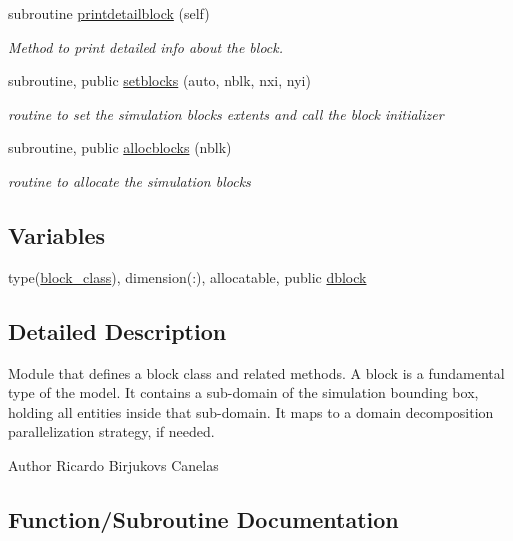 \begin{DoxyCompactItemize}
subroutine \mbox{\hyperlink{namespaceblocks__mod_a10f356706988c45a255922fe70851488}{printdetailblock}} (self)
\begin{DoxyCompactList}\small\item\em Method to print detailed info about the block. \end{DoxyCompactList}\item 
subroutine, public \mbox{\hyperlink{namespaceblocks__mod_a8f5a5d9e6cfd16cfd1b179092a204696}{setblocks}} (auto, nblk, nxi, nyi)
\begin{DoxyCompactList}\small\item\em routine to set the simulation blocks extents and call the block initializer \end{DoxyCompactList}\item 
subroutine, public \mbox{\hyperlink{namespaceblocks__mod_a639beb0fee2290d46353f4b4702d6711}{allocblocks}} (nblk)
\begin{DoxyCompactList}\small\item\em routine to allocate the simulation blocks \end{DoxyCompactList}\end{DoxyCompactItemize}
\subsection*{Variables}
\begin{DoxyCompactItemize}
\item 
type(\mbox{\hyperlink{structblocks__mod_1_1block__class}{block\+\_\+class}}), dimension(\+:), allocatable, public \mbox{\hyperlink{namespaceblocks__mod_ac8ad6e3cf7a812f95dadb592336aca50}{dblock}}
\end{DoxyCompactItemize}


\subsection{Detailed Description}
Module that defines a block class and related methods. A block is a fundamental type of the model. It contains a sub-\/domain of the simulation bounding box, holding all entities inside that sub-\/domain. It maps to a domain decomposition parallelization strategy, if needed. 

\begin{DoxyAuthor}{Author}
Ricardo Birjukovs Canelas 
\end{DoxyAuthor}


\subsection{Function/\+Subroutine Documentation}
\mbox{\label{namespaceblocks__mod_a639beb0fee2290d46353f4b4702d6711}} 
